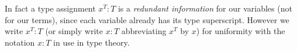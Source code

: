 \begin{definition}
\begin{enumerate}
%
%

\end{enumerate}
\end{definition}

In fact a type assignment $x^T:T$ is a \emph{redundant information} for our
variables (not for our terms), 
since each variable already has its type superscript.
However we write $x^T:T$ (or simply write $x:T$ abbreviating $x^T$ by $x$)
for uniformity with the notation $x:T$ in use in type theory.







